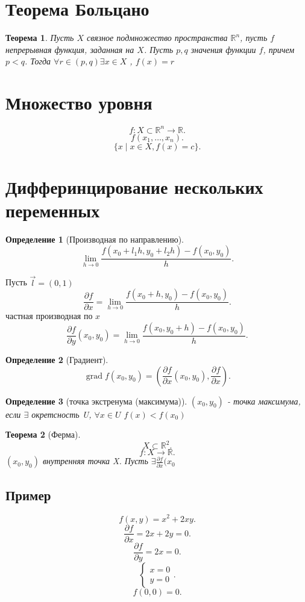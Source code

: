 \documentclass[14pt]{extarticle}
\newtheorem{theorem}{Теорема}
\newtheorem{definition}{Определение}
\DeclareMathOperator{\grad}{grad}
\begin{document}
\section{Теорема Больцано}
\begin{theorem}
    Пусть $X$ связное подмножество пространства  $\mathbb{R}^{n}$,
    пусть $f$ непрерывная функция, заданная на  $X$. Пусть  $p,q$ значения функции  $f$, причем  $p < q$. Тогда  $\forall  r \in (p,q) \exists x \in X$ , $f(x) = r$
\end{theorem}
\section{Множество уровня}
\[
f: X \subset \mathbb{R}^{n} \to \mathbb{R}
.\] 
\[
f(x_1,\dots,x_{n})
.\] 
\[
    \{x \mid x \in X, f(x) = c\}
.\] 
\section{Дифферинцирование нескольких переменных}
\begin{definition}[Производная по направлению]
    \[
    \lim_{h \to 0} \frac{f(x_0 + l_1 h, y_0 + l_2 h) - f(x_0,y_0)}{h}
    .\] 
\end{definition}
Пусть $\vec{l} = (0,1)$
\[
\frac{\partial f}{\partial x}=
\lim_{h \to 0} \frac{f(x_0 + h,y_0) - f(x_0,y_0)}{h}
.\] 
частная производная по $x$
\[
\frac{\partial f}{\partial y} (x_0,y_0) = 
\lim_{h \to 0} \frac{f(x_0,y_0  + h) - f(x_0,y_0)}{h}
.\] 
\begin{definition}[Градиент]
    \[
    \grad f (x_0,y_0) = (\frac{\partial f}{\partial x} (x_0,y_0),\frac{\partial f}{\partial x})
    .\] 
\end{definition}
\begin{definition}[точка экстренума (максимума)]
    $(x_0,y_0)$ - точка максимума, если $\exists$ окретсность U, $\forall x  \in U$  $f(x) < f(x_0)$
\end{definition}
\begin{theorem}[Ферма]
    \[
    X \subset \mathbb{R}^{2}
    .\] 
    \[
    f : X \to \mathbb{R}
    .\] 
    $(x_0,y_0)$ внутренняя точка X. Пусть $\exists  \frac{\partial f}{\partial x} (x_0$
\end{theorem}
\subsection{Пример}
\[
f(x,y) = x^2 + 2xy
.\] 
\[
\frac{\partial f}{\partial x} = 2x + 2y = 0
.\] 
\[
\frac{\partial f}{\partial y} = 2x = 0
.\] 
\[
\begin{cases}
    x = 0\\
    y = 0
\end{cases}
.\] 
\[
f(0,0) = 0
.\] 
\end{document}
